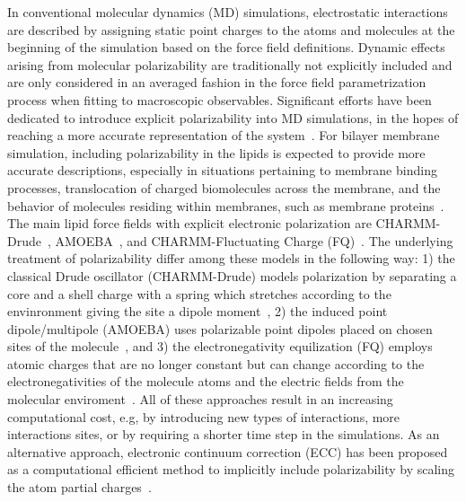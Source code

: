 \documentclass[journal=jacsat,manuscript=article,layout=singlecolumn]{achemso}
\begin{document}
In conventional molecular dynamics (MD) simulations, electrostatic interactions are described by assigning static point charges to the atoms and molecules at the beginning of the simulation based on the force field definitions. Dynamic effects arising from molecular polarizability are traditionally not explicitly included and are only considered in an averaged fashion in the force field parametrization process when fitting to macroscopic observables. Significant efforts have been dedicated to introduce explicit polarizability into MD simulations, in the hopes of reaching a more accurate representation of the system~\cite{Thole1981,ando2001stable,Grossfield2003,
lamoreux2003,Antila2013 ,Lemkul2016, baker2015polarizable,jing2019polarizable }. For bilayer membrane simulation, including polarizability in the lipids is expected to provide more accurate descriptions, especially in situations pertaining to membrane binding processes, translocation of charged biomolecules across the membrane, and the behavior of molecules residing within membranes, such as membrane proteins~\cite{baker2015polarizable,Lemkul2016, li2017drude,chu2018anionicpolarizable,Lynch21,Chen2021,Melcr:2018a, melcr2019improved,nencini22}. 
The main lipid force fields with explicit electronic polarization are CHARMM-Drude~\cite{li2017drude, yu2023drude}, AMOEBA~\cite{chu2018anionicpolarizable,chu2018polarizable}, and CHARMM-Fluctuating Charge (FQ)~\cite{lucas2012charge}. The underlying treatment of polarizability differ among these models in the following way:  1) the classical Drude oscillator (CHARMM-Drude) models polarization by separating a core and a shell charge with a spring which stretches according to the envinronment giving the site a dipole moment~\cite{Lemkul2016},
2) the induced point dipole/multipole (AMOEBA) uses polarizable point dipoles placed on chosen sites of the molecule~\cite{ponder2010current},
and 3) the electronegativity equilization (FQ) employs atomic charges that are no longer constant but can change according to the electronegativities of the molecule atoms and the electric fields from the molecular enviroment~\cite{patel2004charmm}. All of these approaches result in an increasing computational cost, e.g, by introducing new types of interactions, more interactions sites, or by requiring a shorter time step in the simulations. As an alternative approach, electronic continuum correction (ECC) has been proposed as a computational efficient method to implicitly include polarizability by scaling the atom partial charges~\cite{Melcr:2018a,dijon20,Antila2021}.
\end{document}

